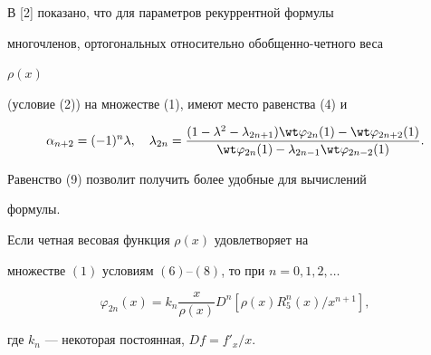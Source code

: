  


В [2] показано, что для параметров рекуррентной формулы 


многочленов, ортогональных относительно обобщенно-четного веса 


$\rho(x)$ 


(условие (2)) на множестве (1), имеют место равенства (4) и 


$$ 


\alpha_{n+2}=(-1)^n\lambda,\quad \lambda_{2n}= 


\frac{(1-\lambda^2-\lambda_{2n+1})\wt\varphi_{2n}(1)- 


\wt\varphi_{2n+2}(1)} 


{\wt\varphi_{2n}(1)-\lambda_{2n-1}\wt\varphi_{2n-2}(1)}. 


$$ 


Равенство (9) позволит получить более удобные для вычислений 


формулы. 


 


\begin{thm} 


Если четная весовая функция $\rho(x)$ удовлетворяет на 


множестве $(1)$ условиям $(6)$--$(8)$, то при $n=0,1,2,\dotsc$ 


\begin{equation} 


\varphi_{2n}(x)=k_n\frac{x}{\rho(x)}D^n[ 


\rho(x)R^n_5(x)/x^{n+1}], 


\end{equation} 


где $k_n$ --- некоторая постоянная, $D f=f'_x/x$. 


\end{thm} 


 


